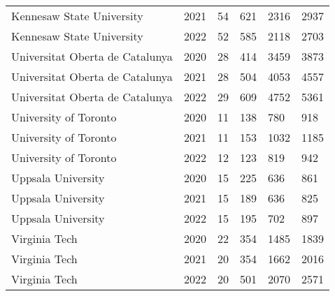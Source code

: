 \begin{tabular}{llp{1.6cm}p{1.6cm}p{1.6cm}p{1.6cm}}
      Kennesaw State University &           2021 &                             54 &                        621 &                     2316 &                     2937 \\
      Kennesaw State University &           2022 &                             52 &                        585 &                     2118 &                     2703 \\
Universitat Oberta de Catalunya &           2020 &                             28 &                        414 &                     3459 &                     3873 \\
Universitat Oberta de Catalunya &           2021 &                             28 &                        504 &                     4053 &                     4557 \\
Universitat Oberta de Catalunya &           2022 &                             29 &                        609 &                     4752 &                     5361 \\
          University of Toronto &           2020 &                             11 &                        138 &                      780 &                      918 \\
          University of Toronto &           2021 &                             11 &                        153 &                     1032 &                     1185 \\
          University of Toronto &           2022 &                             12 &                        123 &                      819 &                      942 \\
             Uppsala University &           2020 &                             15 &                        225 &                      636 &                      861 \\
             Uppsala University &           2021 &                             15 &                        189 &                      636 &                      825 \\
             Uppsala University &           2022 &                             15 &                        195 &                      702 &                      897 \\
                  Virginia Tech &           2020 &                             22 &                        354 &                     1485 &                     1839 \\
                  Virginia Tech &           2021 &                             20 &                        354 &                     1662 &                     2016 \\
                  Virginia Tech &           2022 &                             20 &                        501 &                     2070 &                     2571 \\
\bottomrule
\end{tabular}
